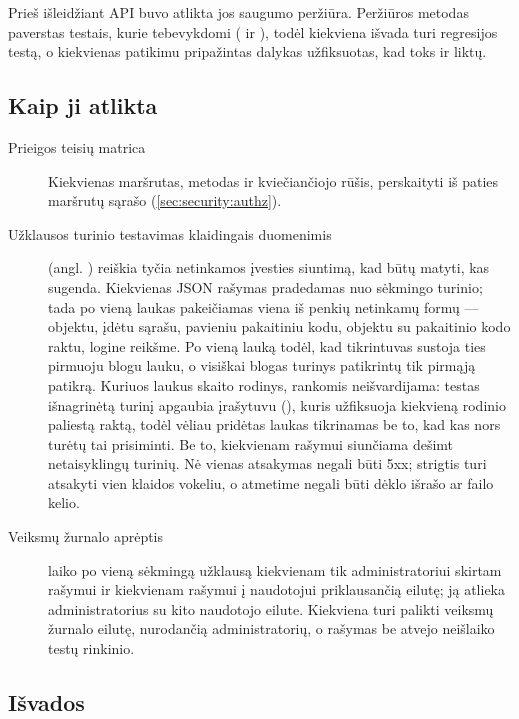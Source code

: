 Prieš išleidžiant API buvo atlikta jos saugumo peržiūra. Peržiūros metodas paverstas testais,
kurie tebevykdomi ( ir ),
todėl kiekviena išvada turi regresijos testą, o kiekvienas patikimu pripažintas dalykas
užfiksuotas, kad toks ir liktų.

\subsection{Kaip ji atlikta}

\begin{description}
  \item[Prieigos teisių matrica] Kiekvienas maršrutas, metodas ir kviečiančiojo rūšis,
    perskaityti iš paties maršrutų sąrašo (\cref{sec:security:authz}).
  \item[Užklausos turinio testavimas klaidingais duomenimis]  (angl.
    ) reiškia tyčia netinkamos įvesties siuntimą, kad būtų matyti, kas sugenda.
    Kiekvienas JSON rašymas pradedamas nuo sėkmingo turinio; tada po vieną laukas pakeičiamas
    viena iš penkių netinkamų formų --- objektu, įdėtu sąrašu, pavieniu pakaitiniu kodu,
    objektu su pakaitinio kodo raktu, logine reikšme. Po vieną lauką todėl, kad tikrintuvas
    sustoja ties pirmuoju blogu lauku, o visiškai blogas turinys patikrintų tik pirmąją
    patikrą. Kuriuos laukus skaito rodinys, rankomis neišvardijama: testas išnagrinėtą turinį
    apgaubia įrašytuvu (), kuris užfiksuoja kiekvieną rodinio paliestą raktą,
    todėl vėliau pridėtas laukas tikrinamas be to, kad kas nors turėtų tai prisiminti. Be to,
    kiekvienam rašymui siunčiama dešimt netaisyklingų turinių. Nė vienas atsakymas negali būti
    5xx; strigtis turi atsakyti vien klaidos vokeliu, o atmetime negali būti dėklo išrašo
    ar failo kelio.
  \item[Veiksmų žurnalo aprėptis]  laiko po vieną sėkmingą užklausą
    kiekvienam tik administratoriui skirtam rašymui ir kiekvienam rašymui į naudotojui
    priklausančią eilutę; ją atlieka administratorius su kito naudotojo eilute. Kiekviena turi
    palikti veiksmų žurnalo eilutę, nurodančią administratorių, o rašymas be atvejo neišlaiko
    testų rinkinio.
\end{description}

\subsection{Išvados}


